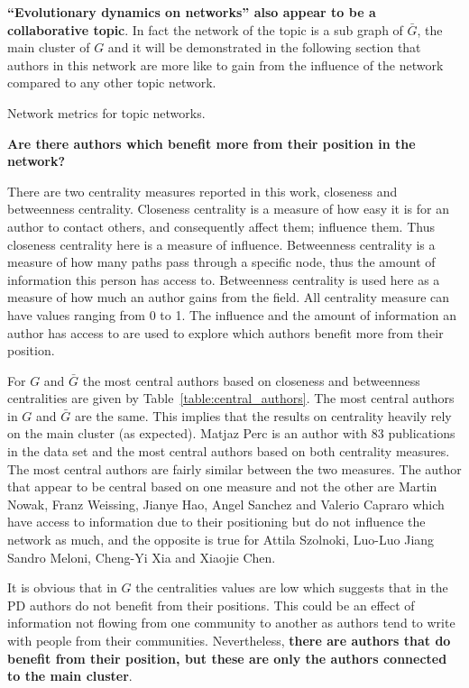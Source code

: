 \textbf{``Evolutionary dynamics on networks'' also appear to be a collaborative topic}.
In fact the network of the topic  is a
sub graph of \(\bar{G}\), the main cluster of \(G\) and it will be demonstrated in the following section that
authors in this network are more like to gain from the influence of the network
compared to any other topic network.

\begin{table}[!hbtp]
    \centering
    \resizebox{\textwidth}{!}{
    }
    \caption{Network metrics for topic networks.}\label{table:topics_networks}
\end{table}

\textbf{Are there authors which benefit more from their position in the network?}

There are two centrality measures reported in this work, closeness and
betweenness centrality. Closeness centrality is a measure of how easy it is for
an author to contact others, and consequently affect them; influence them. Thus
closeness centrality here is a measure of influence. Betweenness centrality is a
measure of how many paths pass through a specific node, thus the amount of
information this person has access to. Betweenness centrality is used here as a
measure of how much an author gains from the field. All centrality measure can
have values ranging from 0 to 1. The influence and the amount of information
an author has access to are used to explore which authors benefit more
from their position.

For \(G\) and \(\bar{G}\) the most central authors based on closeness and
betweenness centralities are given by Table~\ref{table:central_authors}. The
most central authors in \(G\) and \(\bar{G}\) are the same. This implies that
the results on centrality heavily rely on the main cluster (as expected). Matjaz Perc is an
author with 83 publications in the data set and the most central authors based
on both centrality measures. The most central authors are fairly similar between
the two measures. The author that appear to be central based on one measure and
not the other are Martin Nowak, Franz Weissing, Jianye Hao, Angel Sanchez and
Valerio Capraro which have access to information due to their
positioning but do not influence the network as much, and the opposite is true
for Attila Szolnoki, Luo-Luo Jiang Sandro Meloni, Cheng-Yi Xia and Xiaojie Chen.

It is obvious that in \(G\) the centralities values are low which suggests
that in the PD authors do not benefit from their positions. This could be an
effect of information not flowing from one community to another as authors tend
to write with people from their communities. Nevertheless,
\textbf{there are authors that do benefit from their position, but these are
only the authors connected to the main cluster}.

